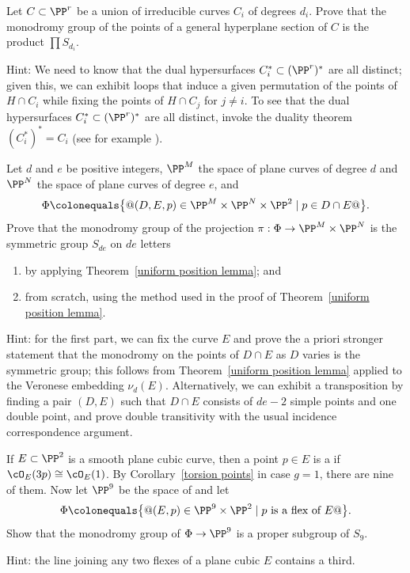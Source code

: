 \begin{exercise}
Let $C \subset \PP^r$ be a union of irreducible curves $C_i$ of degrees
$d_i$. Prove that the monodromy group of the points of a general
hyperplane section of $C$ is the product $\prod S_{d_i}$.

Hint: We need to know that the dual hypersurfaces $C_i^* \subset
(\PP^r)^*$ are all distinct; given this, we can exhibit loops that induce
a given permutation of the points of $H \cap C_i$ while fixing the points
of $H \cap C_j$ for $j \neq i$. To see that the dual hypersurfaces $C_i^*
\subset (\PP^r)^*$ are all distinct, invoke the duality theorem $(C_i^*)^*
= C_i$ (see for example \cite{3264}).
\end{exercise}

\begin{exercise}
Let $d$ and $e$ be positive integers, $\PP^M$ the space of plane curves
of degree $d$ and $\PP^N$ the space of plane curves of degree $e$, and
$$
\Phi \colonequals  \big\{@ (D, E, p) \in \PP^M \times \PP^N \times \PP^2 \mid
p \in D \cap E@\big \}.
$$
Prove that the monodromy group of the projection $\pi : \Phi \to \PP^M
\times \PP^N$ is the symmetric group $S_{de}$ on $de$ letters
\begin{enumerate}
\item by applying Theorem~\ref{uniform position lemma}; and
\item from scratch, using the method used in the proof of
Theorem~\ref{uniform position lemma}.
\end{enumerate}

Hint: for the first part, we can fix the curve $E$ and prove the
a priori stronger statement that the monodromy on the points of
$D \cap E$ as $D$ varies is the symmetric group; this follows from
Theorem~\ref{uniform position lemma} applied to the Veronese embedding
$\nu_d(E)$. Alternatively, we can exhibit a transposition by finding a
pair $(D,E)$ such that $D \cap E$ consists of $de-2$ simple points and
one double point, and prove double transitivity with the usual incidence
correspondence argument.
\end{exercise}

\begin{exercise}
If $E \subset \PP^2$ is a smooth plane cubic curve, then a point $p \in E$
is  a 
%
%
if $\cO_E(3p) \cong \cO_E(1)$. By Corollary~\ref{torsion
points} in case $g=1$, there are nine of them. Now let $\PP^9$ be the
space of 
%
and let
$$
\Phi \colonequals  \big\{@(E, p) \in \PP^9 \times \PP^2 \mid p \text{ is a
flex of } E@ \big \}.
$$
Show that the monodromy group of $\Phi \to \PP^9$ is a proper subgroup
of $S_9$.

Hint: the line joining any two flexes of a plane cubic $E$ contains
a third.
\end{exercise}

